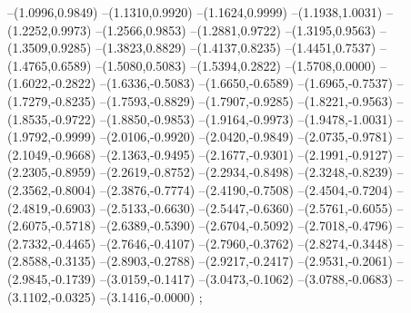 {--(1.0996,0.9849)
--(1.1310,0.9920)
--(1.1624,0.9999)
--(1.1938,1.0031)
--(1.2252,0.9973)
--(1.2566,0.9853)
--(1.2881,0.9722)
--(1.3195,0.9563)
--(1.3509,0.9285)
--(1.3823,0.8829)
--(1.4137,0.8235)
--(1.4451,0.7537)
--(1.4765,0.6589)
--(1.5080,0.5083)
--(1.5394,0.2822)
--(1.5708,0.0000)
--(1.6022,-0.2822)
--(1.6336,-0.5083)
--(1.6650,-0.6589)
--(1.6965,-0.7537)
--(1.7279,-0.8235)
--(1.7593,-0.8829)
--(1.7907,-0.9285)
--(1.8221,-0.9563)
--(1.8535,-0.9722)
--(1.8850,-0.9853)
--(1.9164,-0.9973)
--(1.9478,-1.0031)
--(1.9792,-0.9999)
--(2.0106,-0.9920)
--(2.0420,-0.9849)
--(2.0735,-0.9781)
--(2.1049,-0.9668)
--(2.1363,-0.9495)
--(2.1677,-0.9301)
--(2.1991,-0.9127)
--(2.2305,-0.8959)
--(2.2619,-0.8752)
--(2.2934,-0.8498)
--(2.3248,-0.8239)
--(2.3562,-0.8004)
--(2.3876,-0.7774)
--(2.4190,-0.7508)
--(2.4504,-0.7204)
--(2.4819,-0.6903)
--(2.5133,-0.6630)
--(2.5447,-0.6360)
--(2.5761,-0.6055)
--(2.6075,-0.5718)
--(2.6389,-0.5390)
--(2.6704,-0.5092)
--(2.7018,-0.4796)
--(2.7332,-0.4465)
--(2.7646,-0.4107)
--(2.7960,-0.3762)
--(2.8274,-0.3448)
--(2.8588,-0.3135)
--(2.8903,-0.2788)
--(2.9217,-0.2417)
--(2.9531,-0.2061)
--(2.9845,-0.1739)
--(3.0159,-0.1417)
--(3.0473,-0.1062)
--(3.0788,-0.0683)
--(3.1102,-0.0325)
--(3.1416,-0.0000)
;}

